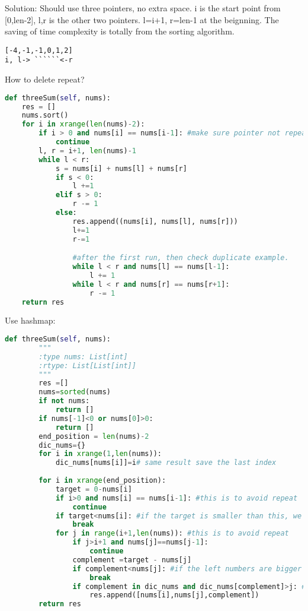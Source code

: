 \documentclass[../../question_3_array_question.tex]{subfiles}
\begin{document}
Solution: Should use three pointers, no extra space. i is the start point from [0,len-2], l,r is the other two pointers. l=i+1, r=len-1 at the beignning. The saving of time complexity is totally from the sorting algorithm.
\begin{lstlisting}
[-4,-1,-1,0,1,2]
i, l-> ``````<-r
\end{lstlisting}
How to delete repeat?
\begin{lstlisting}[language = Python]
def threeSum(self, nums):
    res = []
    nums.sort()
    for i in xrange(len(nums)-2):
        if i > 0 and nums[i] == nums[i-1]: #make sure pointer not repeat
            continue
        l, r = i+1, len(nums)-1
        while l < r:
            s = nums[i] + nums[l] + nums[r]
            if s < 0:
                l +=1 
            elif s > 0:
                r -= 1
            else:
                res.append((nums[i], nums[l], nums[r]))
                l+=1
                r-=1

                #after the first run, then check duplicate example.
                while l < r and nums[l] == nums[l-1]:
                    l += 1
                while l < r and nums[r] == nums[r+1]:
                    r -= 1
    return res
\end{lstlisting}
Use hashmap:
\begin{lstlisting}[language = Python]
def threeSum(self, nums):
        """
        :type nums: List[int]
        :rtype: List[List[int]]
        """
        res =[]
        nums=sorted(nums)
        if not nums:
            return []
        if nums[-1]<0 or nums[0]>0:
            return []
        end_position = len(nums)-2
        dic_nums={}
        for i in xrange(1,len(nums)):
            dic_nums[nums[i]]=i# same result save the last index
        
        for i in xrange(end_position):
            target = 0-nums[i]
            if i>0 and nums[i] == nums[i-1]: #this is to avoid repeat 
                continue
            if target<nums[i]: #if the target is smaller than this, we can not find them on the right side
                break
            for j in range(i+1,len(nums)): #this is to avoid repeat 
                if j>i+1 and nums[j]==nums[j-1]:
                    continue
                complement =target - nums[j]
                if complement<nums[j]: #if the left numbers are bigger than the complement, no need to keep searching
                    break
                if complement in dic_nums and dic_nums[complement]>j: #need to make sure the complement is bigger than nums[j]
                    res.append([nums[i],nums[j],complement])
        return res
\end{lstlisting}
\end{document}
